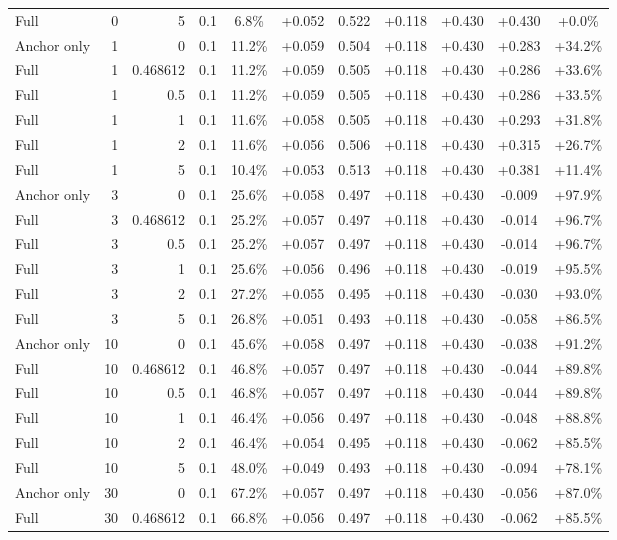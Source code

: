 \begin{table}[htbp]
\begin{tabular}{lrrrccccccc}
Full & 0 & 5 & 0.1 & 6.8\% & +0.052 & 0.522 & +0.118 & +0.430 & +0.430 & +0.0\% \\
Anchor only & 1 & 0 & 0.1 & 11.2\% & +0.059 & 0.504 & +0.118 & +0.430 & +0.283 & +34.2\% \\
Full & 1 & 0.468612 & 0.1 & 11.2\% & +0.059 & 0.505 & +0.118 & +0.430 & +0.286 & +33.6\% \\
Full & 1 & 0.5 & 0.1 & 11.2\% & +0.059 & 0.505 & +0.118 & +0.430 & +0.286 & +33.5\% \\
Full & 1 & 1 & 0.1 & 11.6\% & +0.058 & 0.505 & +0.118 & +0.430 & +0.293 & +31.8\% \\
Full & 1 & 2 & 0.1 & 11.6\% & +0.056 & 0.506 & +0.118 & +0.430 & +0.315 & +26.7\% \\
Full & 1 & 5 & 0.1 & 10.4\% & +0.053 & 0.513 & +0.118 & +0.430 & +0.381 & +11.4\% \\
Anchor only & 3 & 0 & 0.1 & 25.6\% & +0.058 & 0.497 & +0.118 & +0.430 & -0.009 & +97.9\% \\
Full & 3 & 0.468612 & 0.1 & 25.2\% & +0.057 & 0.497 & +0.118 & +0.430 & -0.014 & +96.7\% \\
Full & 3 & 0.5 & 0.1 & 25.2\% & +0.057 & 0.497 & +0.118 & +0.430 & -0.014 & +96.7\% \\
Full & 3 & 1 & 0.1 & 25.6\% & +0.056 & 0.496 & +0.118 & +0.430 & -0.019 & +95.5\% \\
Full & 3 & 2 & 0.1 & 27.2\% & +0.055 & 0.495 & +0.118 & +0.430 & -0.030 & +93.0\% \\
Full & 3 & 5 & 0.1 & 26.8\% & +0.051 & 0.493 & +0.118 & +0.430 & -0.058 & +86.5\% \\
Anchor only & 10 & 0 & 0.1 & 45.6\% & +0.058 & 0.497 & +0.118 & +0.430 & -0.038 & +91.2\% \\
Full & 10 & 0.468612 & 0.1 & 46.8\% & +0.057 & 0.497 & +0.118 & +0.430 & -0.044 & +89.8\% \\
Full & 10 & 0.5 & 0.1 & 46.8\% & +0.057 & 0.497 & +0.118 & +0.430 & -0.044 & +89.8\% \\
Full & 10 & 1 & 0.1 & 46.4\% & +0.056 & 0.497 & +0.118 & +0.430 & -0.048 & +88.8\% \\
Full & 10 & 2 & 0.1 & 46.4\% & +0.054 & 0.495 & +0.118 & +0.430 & -0.062 & +85.5\% \\
Full & 10 & 5 & 0.1 & 48.0\% & +0.049 & 0.493 & +0.118 & +0.430 & -0.094 & +78.1\% \\
Anchor only & 30 & 0 & 0.1 & 67.2\% & +0.057 & 0.497 & +0.118 & +0.430 & -0.056 & +87.0\% \\
Full & 30 & 0.468612 & 0.1 & 66.8\% & +0.056 & 0.497 & +0.118 & +0.430 & -0.062 & +85.5\% \\

\end{tabular}
\end{table}
